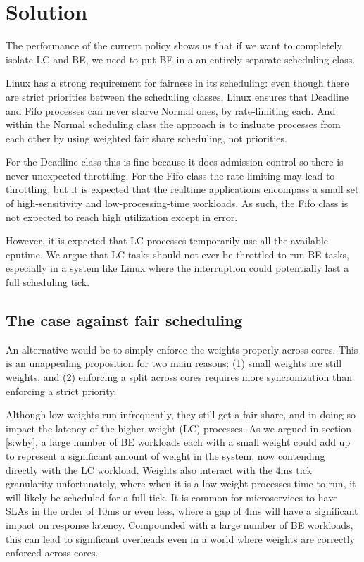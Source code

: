 \section{Solution}\label{s:solution}


The performance of the current \schedidle{} policy shows us that if we want to
completely isolate LC and BE, we need to put BE in a an entirely separate
scheduling class.

Linux has a strong requirement for fairness in its scheduling: even though there
are strict priorities between the scheduling classes, Linux ensures that
Deadline and Fifo processes can never starve Normal ones, by rate-limiting each.
And within the Normal scheduling class the approach is to insluate processes
from each other by using weighted fair share scheduling, not priorities.

For the Deadline class this is fine because it does admission control so there
is never unexpected throttling. For the Fifo class the rate-limiting may lead to
throttling, but it is expected that the realtime applications encompass a small
set of high-sensitivity and low-processing-time workloads. As such, the Fifo
class is not expected to reach high utilization except in error.

However, it is expected that LC processes temporarily use all the
available cputime. We argue that LC tasks should not ever be throttled to run BE
tasks, especially in a system like Linux where the interruption could
potentially last a full scheduling tick. 


\subsection{The case against fair scheduling}


An alternative would be to simply enforce the weights properly across cores.
This is an unappealing proposition for two main reasons: (1) small weights are
still weights, and (2) enforcing a split across cores requires more
syncronization than enforcing a strict priority.

Although low weights run infrequently, they still get a fair share, and in doing
so impact the latency of the higher weight (LC) processes. As we argued in
section \autoref{s:why}, a large number of BE workloads each with a small weight
could add up to represent a significant amount of weight in the system, now
contending directly with the LC workload. Weights also interact with the 4ms
tick granularity unfortunately, where when it is a low-weight processes time to
run, it will likely be scheduled for a full tick. It is common for microservices
to have SLAs in the order of 10ms or even less, where a gap of 4ms will have a
significant impact on response latency. Compounded with a large number of BE
workloads, this can lead to significant overheads even in a world where weights
are correctly enforced across cores.


